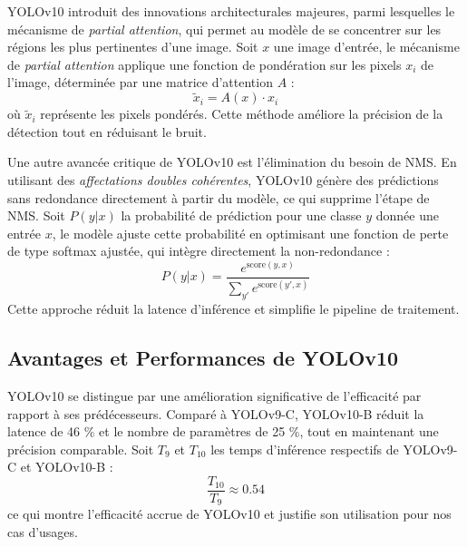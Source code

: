 \documentclass[13pt,a4paper]{article}
\begin{document}
YOLOv10 introduit des innovations architecturales majeures, parmi lesquelles le mécanisme de \textit{partial attention}, qui permet au modèle de se concentrer sur les régions les plus pertinentes d'une image. Soit $x$ une image d'entrée, le mécanisme de \textit{partial attention} applique une fonction de pondération sur les pixels $x_i$ de l'image, déterminée par une matrice d'attention $A$ :
\[
\tilde{x}_i = A(x) \cdot x_i
\]
où $\tilde{x}_i$ représente les pixels pondérés. Cette méthode améliore la précision de la détection tout en réduisant le bruit.

Une autre avancée critique de YOLOv10 est l'élimination du besoin de NMS. En utilisant des \textit{affectations doubles cohérentes}, YOLOv10 génère des prédictions sans redondance directement à partir du modèle, ce qui supprime l'étape de NMS. Soit $P(y|x)$ la probabilité de prédiction pour une classe $y$ donnée une entrée $x$, le modèle ajuste cette probabilité en optimisant une fonction de perte de type softmax ajustée, qui intègre directement la non-redondance :
\[
P(y|x) = \frac{e^{\text{score}(y,x)}}{\sum_{y'} e^{\text{score}(y',x)}}
\]
Cette approche réduit la latence d'inférence et simplifie le pipeline de traitement.

\subsection{Avantages et Performances de YOLOv10}

YOLOv10 se distingue par une amélioration significative de l'efficacité par rapport à ses prédécesseurs. Comparé à YOLOv9-C, YOLOv10-B réduit la latence de 46 \% et le nombre de paramètres de 25 \%, tout en maintenant une précision comparable. Soit $T_{9}$ et $T_{10}$ les temps d'inférence respectifs de YOLOv9-C et YOLOv10-B :
\[
\frac{T_{10}}{T_{9}} \approx 0.54
\]
ce qui montre l'efficacité accrue de YOLOv10 et justifie son utilisation pour nos cas d'usages.

\vspace{2cm}
\hspace{1cm} 

\newpage
\end{document}
